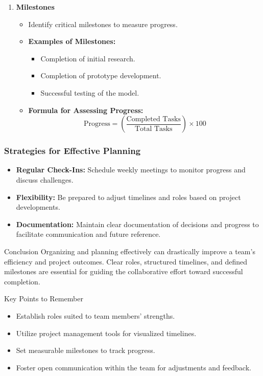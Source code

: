 \documentclass[aspectratio=169]{beamer}
\begin{document}
\begin{frame}[fragile]
\begin{enumerate}
        \item \textbf{Milestones}
        \begin{itemize}
            \item Identify critical milestones to measure progress.
            \item \textbf{Examples of Milestones:}
            \begin{itemize}
                \item Completion of initial research.
                \item Completion of prototype development.
                \item Successful testing of the model.
            \end{itemize}
            \item \textbf{Formula for Assessing Progress:}  
            \begin{equation}
            \text{Progress} = \left( \frac{\text{Completed Tasks}}{\text{Total Tasks}} \right) \times 100
            \end{equation}
        \end{itemize}
    \end{enumerate}
\end{frame}

\begin{frame}[fragile]
    \frametitle{Strategies for Effective Planning}
    \begin{itemize}
        \item \textbf{Regular Check-Ins:} Schedule weekly meetings to monitor progress and discuss challenges.
        \item \textbf{Flexibility:} Be prepared to adjust timelines and roles based on project developments.
        \item \textbf{Documentation:} Maintain clear documentation of decisions and progress to facilitate communication and future reference.
    \end{itemize}

    \begin{block}{Conclusion}
        Organizing and planning effectively can drastically improve a team's efficiency and project outcomes. Clear roles, structured timelines, and defined milestones are essential for guiding the collaborative effort toward successful completion.
    \end{block}

    \begin{block}{Key Points to Remember}
        \begin{itemize}
            \item Establish roles suited to team members' strengths.
            \item Utilize project management tools for visualized timelines.
            \item Set measurable milestones to track progress.
            \item Foster open communication within the team for adjustments and feedback.
        \end{itemize}
    \end{block}
\end{frame}
\end{document}
